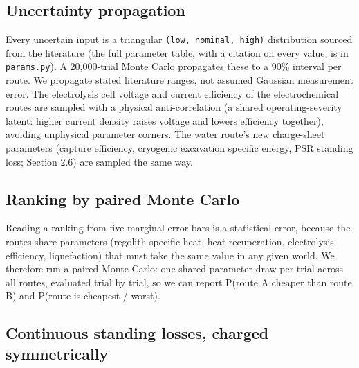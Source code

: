 \documentclass[11pt,a4paper]{article}
\begin{document}
\subsection{Uncertainty propagation}

Every uncertain input is a triangular \texttt{(low, nominal, high)} distribution sourced
from the literature (the full parameter table, with a citation on every value, is in
\texttt{params.py}). A 20,000-trial Monte Carlo propagates these to a 90\% interval per
route. We propagate stated literature ranges, not assumed Gaussian measurement error.
The electrolysis cell voltage and current efficiency of the electrochemical routes are
sampled with a physical anti-correlation (a shared operating-severity latent: higher
current density raises voltage and lowers efficiency together), avoiding unphysical
parameter corners. The water route's new charge-sheet parameters (capture efficiency,
cryogenic excavation specific energy, PSR standing loss; Section 2.6) are sampled the
same way.

\subsection{Ranking by paired Monte Carlo}

Reading a ranking from five marginal error bars is a statistical error, because the
routes share parameters (regolith specific heat, heat recuperation, electrolysis
efficiency, liquefaction) that must take the same value in any given world. We therefore
run a paired Monte Carlo: one shared parameter draw per trial across all routes,
evaluated trial by trial, so we can report P(route A cheaper than route B) and P(route
is cheapest / worst).

\subsection{Continuous standing losses, charged symmetrically}
\end{document}
